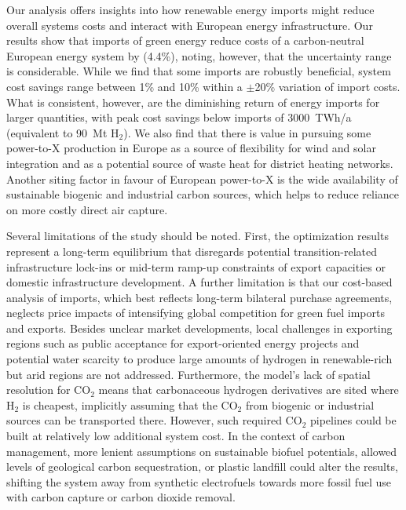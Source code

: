 Our analysis offers insights into how renewable energy imports might reduce
overall systems costs and interact with European energy infrastructure. Our
results show that imports of green energy reduce costs of a carbon-neutral
European energy system by  (4.4\%), noting, however, that the
uncertainty range is considerable. While we find that some imports are robustly
beneficial, system cost savings range between 1\% and 10\% within a $\pm$20\%
variation of import costs. What is consistent, however, are the diminishing
return of energy imports for larger quantities, with peak cost savings below
imports of 3000~TWh/a (equivalent to 90~Mt H$_2$). We also find that there is
value in pursuing some \mbox{power-to-X} production in Europe as a source of
flexibility for wind and solar integration and as a potential source of waste
heat for district heating networks. Another siting factor in favour of European
\mbox{power-to-X} is the  wide availability of sustainable biogenic and
industrial carbon sources, which helps to reduce reliance on more costly direct
air capture.


Several limitations of the study should be noted. First, the optimization
results represent a long-term equilibrium that disregards potential
transition-related infrastructure lock-ins or mid-term ramp-up constraints of
export capacities or domestic infrastructure development. A further limitation
is that our cost-based analysis of imports, which best reflects long-term
bilateral purchase agreements, neglects price impacts of intensifying global
competition for green fuel imports and exports. Besides unclear market
developments, local challenges in exporting regions such as public acceptance
for export-oriented energy projects\cite{ishmamMappingLocalGreen2024} and
potential water
scarcity\cite{franzmannGreenHydrogenCostpotentials2023,terlouwFutureHydrogenEconomies2024}
to produce large amounts of hydrogen in renewable-rich but arid regions are not
addressed. Furthermore, the model's lack of spatial resolution for CO$_2$ means
that carbonaceous hydrogen derivatives are sited where H$_2$ is cheapest,
implicitly assuming that the CO$_2$ from biogenic or industrial sources can be
transported there. However, such required CO$_2$ pipelines could be built at
relatively low additional system cost.\cite{hofmannH2CO2Network2024} In the
context of carbon management, more lenient assumptions on sustainable biofuel
potentials, allowed levels of geological carbon sequestration, or plastic
landfill could alter the results, shifting the system away from synthetic
electrofuels towards more fossil fuel use with carbon capture or carbon dioxide
removal.\cite{hofmannH2CO2Network2024,millingerDiversityBiomassUsage2023}

